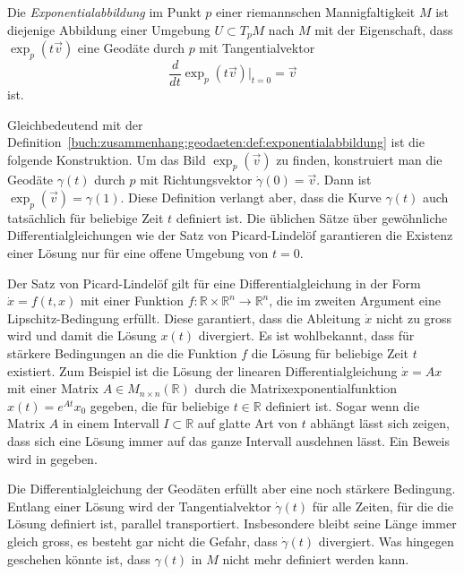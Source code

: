 \begin{definition}[Exponentialabbildung]
\label{buch:zusammenhang:geodaeten:def:exponentialabbildung}
Die \emph{Exponentialabbildung} im Punkt $p$ einer riemannschen
%
Mannigfaltigkeit $M$ ist diejenige Abbildung einer Umgebung $U\subset T_pM$
nach $M$ mit der Eigenschaft, dass $\exp_p(t\vec{v})$ eine Geodäte
durch $p$ mit Tangentialvektor
\[
\frac{d}{dt}
\exp_p(t\vec{v})\bigg|_{t=0}
=
\vec{v}
\]
ist.
\end{definition}

Gleichbedeutend mit der
Definition~\ref{buch:zusammenhang:geodaeten:def:exponentialabbildung}
ist die folgende Konstruktion.
Um das Bild $\exp_p(\vec{v})$ zu finden, konstruiert man die
Geodäte $\gamma(t)$ durch $p$ mit Richtungsvektor $\dot{\gamma}(0)=\vec{v}$.
Dann ist $\exp_p(\vec{v})=\gamma(1)$.
Diese Definition verlangt aber, dass die Kurve $\gamma(t)$ auch tatsächlich
für beliebige Zeit $t$ definiert ist.
Die üblichen Sätze über gewöhnliche Differentialgleichungen wie der
Satz von Picard-Lindelöf garantieren die Existenz einer Lösung nur
%
für eine offene Umgebung von $t=0$.

Der Satz von Picard-Lindelöf gilt für eine Differentialgleichung
in der Form $\dot{x} = f(t,x)$ mit einer Funktion
$f\colon\mathbb{R}\times\mathbb{R}^n \to \mathbb{R}^n$, die im zweiten
Argument eine Lipschitz-Bedingung erfüllt.
%
Diese garantiert, dass die Ableitung $\dot{x}$ nicht zu gross wird und
damit die Lösung $x(t)$ divergiert.
Es ist wohlbekannt, dass für stärkere Bedingungen an die die Funktion $f$ 
die Lösung für beliebige Zeit $t$ existiert.
Zum Beispiel ist die Lösung der linearen Differentialgleichung
$\dot{x}=Ax$ mit einer Matrix $A\in M_{n\times n}(\mathbb{R})$
durch die Matrixexponentialfunktion $x(t) = e^{At}x_0$ gegeben, die
für beliebige $t\in\mathbb{R}$ definiert ist.
Sogar wenn die Matrix $A$ in einem Intervall $I\subset\mathbb{R}$
auf glatte Art von $t$ abhängt lässt sich zeigen, dass sich eine
Lösung immer auf das ganze Intervall ausdehnen lässt.
Ein Beweis wird in \cite[Theorem 4.31]{buch:leerm} gegeben.

Die Differentialgleichung der Geodäten erfüllt aber eine noch 
stärkere Bedingung.
Entlang einer Lösung wird der Tangentialvektor $\dot{\gamma}(t)$ 
für alle Zeiten, für die die Lösung definiert ist, parallel transportiert.
Insbesondere bleibt seine Länge immer gleich gross, es besteht gar
nicht die Gefahr, dass $\dot{\gamma}(t)$ divergiert.
Was hingegen geschehen könnte ist, dass $\gamma(t)$ in $M$ nicht
mehr definiert werden kann.

